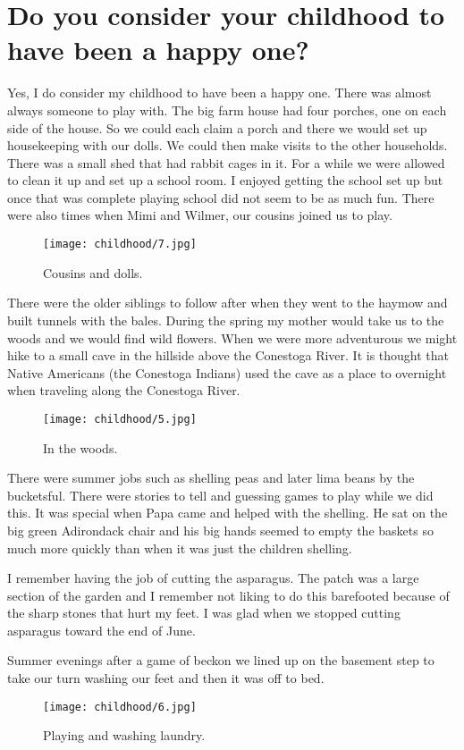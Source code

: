 \section{Do you consider your childhood to have been a happy one?}
Yes, I do consider my childhood to have been a happy one.
There was almost always someone to play with.
The big farm house had four porches, one on each side of the house.
So we could each claim a porch and there we would set up housekeeping with our dolls.
We could then make visits to the other households.
There was a small shed that had rabbit cages in it.
For a while we were allowed to clean it up and set up a school room.
I enjoyed getting the school set up but once that was complete playing school did not seem to be as much fun.
There were also times when Mimi and Wilmer, our cousins joined us to play.
\begin{figure}
\centering
\texttt{[image: childhood/7.jpg]}
\caption{
Cousins and dolls.
}
\end{figure}


There were the older siblings to follow after when they went to the haymow and built tunnels with the bales.
During the spring my mother would take us to the woods and we would find wild flowers.
When we were more adventurous we might hike to a small cave in the hillside above the Conestoga River.
It is thought that Native Americans (the Conestoga Indians) used the cave as a place to overnight when traveling along the Conestoga River.
\begin{figure}
\centering
\texttt{[image: childhood/5.jpg]}
\caption{
In the woods.
}
\end{figure}

There were summer jobs such as shelling peas and later lima beans by the bucketsful.
There were stories to tell and guessing games to play while we did this.
It was special when Papa came and helped with the shelling.
He sat on the big green Adirondack chair and his big hands seemed to empty the baskets so much more quickly than when it was just the children shelling.

I remember having the job of cutting the asparagus.
The patch was a large section of the garden and I remember not liking to do this barefooted because of the sharp stones that hurt my feet.
I was glad when we stopped cutting asparagus toward the end of June.

Summer evenings after a game of beckon we lined up on the basement step to take our turn washing our feet and then it was off to bed.
\begin{figure}
\centering
\texttt{[image: childhood/6.jpg]}
\caption{
Playing and washing laundry.
}
\end{figure}

